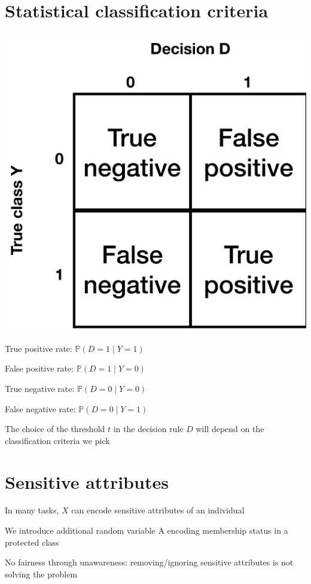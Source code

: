 \documentclass[10pt]{article}
\begin{document}
\section*{Statistical classification criteria}
\begin{center}
\includegraphics[max width=\textwidth]{2024_01_08_7c1a383b1e6170f910e4g-22}
\end{center}

True positive rate: $\mathbb{P}(D=1 \mid Y=1)$

False positive rate: $\mathbb{P}(D=1 \mid Y=0)$

True negative rate: $\mathbb{P}(D=0 \mid Y=0)$

False negative rate: $\mathbb{P}(D=0 \mid Y=1)$

The choice of the threshold $t$ in the decision rule $D$ will depend on the classification criteria we pick

\section*{Sensitive attributes}
In many tasks, $X$ can encode sensitive attributes of an individual

We introduce additional random variable A encoding membership status in a protected class

No fairness through unawareness: removing/ignoring sensitive attributes is not solving the problem
\end{document}
